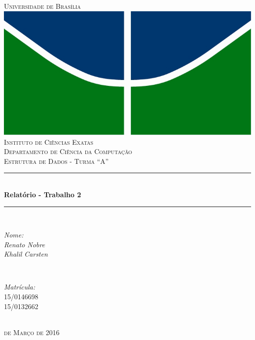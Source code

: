 \documentclass[a4paper, 12pt]{article}
\begin{document}
	\begin{titlepage}

		\newcommand{\HRule}{\rule{\linewidth}{0.5mm}}
		\centering
	    \textsc{\LARGE Universidade de Brasília}\\[0.5cm]
	    \includegraphics{logo.jpg}\\[0.5cm]
		\textsc{\Large Instituto de Ciências Exatas}\\[0.5cm]
	    \textsc{\Large Departamento de Ciência da Computação}\\[0.5cm]
		\textsc{\Large Estrutura de Dados - Turma ``A''}\\[0.5cm]
	    \HRule \\[0.4cm]
	    { \huge \bfseries Relatório - Trabalho 2}\\
	      \HRule \\[1.5cm]
	      	\begin{minipage}{0.4\textwidth}
	      		\begin{flushleft} \large
	      			\emph{Nome:}\\
	     			\emph{Renato Nobre}\\
	      			\emph{Khalil Carsten}\\
	      		\end{flushleft}
	      	\end{minipage}
	      	~
	      	\begin{minipage}{0.4\textwidth}
	      		\begin{flushright} \large
	      			\emph{Matrícula:}\\
	     			\textsc{15/0146698}\\
	        		\textsc{15/0132662}\\
	      		\end{flushright}
	      	\end{minipage}\\[2cm]
		\textsc{\large {} de Março de 2016}\\
	\end{titlepage}
\end{document}
